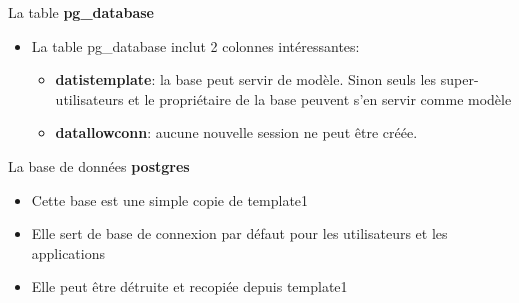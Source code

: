 
\begin{frame}{La table \textbf{pg\_database}}

\begin{itemize}
   \item La table pg\_database inclut 2 colonnes intéressantes:
   \begin{itemize}
      \item \textbf{datistemplate}: la base peut servir de modèle. Sinon seuls les super-utilisateurs et le propriétaire de la base peuvent s'en servir comme modèle
      \item \textbf{datallowconn}: aucune nouvelle session ne peut être créée.
   \end{itemize}
\end{itemize}

\end{frame}


\begin{frame}{La base de données \textbf{postgres}}

\begin{itemize}
   \item Cette base est une simple copie de template1
   \item Elle sert de base de connexion par défaut pour les utilisateurs et les applications
   \item Elle peut être détruite et recopiée depuis template1
\end{itemize}

\end{frame}


%
%
%
%
%
%
%
%
%
%

\newlength{\largeurtableau}
\setlength{\largeurtableau}{\textwidth}
\addtolength{\largeurtableau}{-2\leftmarginii}


